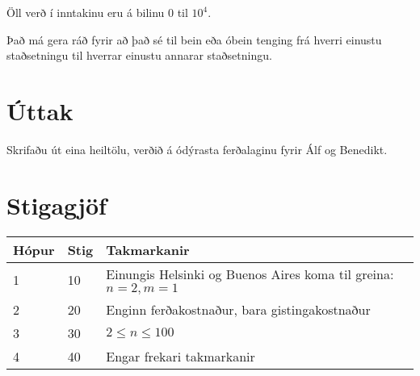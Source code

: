 Öll verð í inntakinu eru á bilinu $0$ til $10^4$.

Það má gera ráð fyrir að það sé til bein eða óbein tenging frá 
hverri einustu staðsetningu til hverrar einustu annarar staðsetningu.

\section*{Úttak}
Skrifaðu út eina heiltölu, verðið á ódýrasta ferðalaginu fyrir Álf og Benedikt.

\section*{Stigagjöf}
\begin{tabular}{|l|l|l|}
\hline
Hópur & Stig & Takmarkanir \\ \hline
1     & 10   & Einungis Helsinki og Buenos Aires koma til greina: $n = 2, m = 1$ \\ \hline
2     & 20   & Enginn ferðakostnaður, bara gistingakostnaður \\ \hline
3     & 30   & $2 \leq n \leq 100$ \\ \hline
4     & 40   & Engar frekari takmarkanir\\ \hline
\end{tabular}

